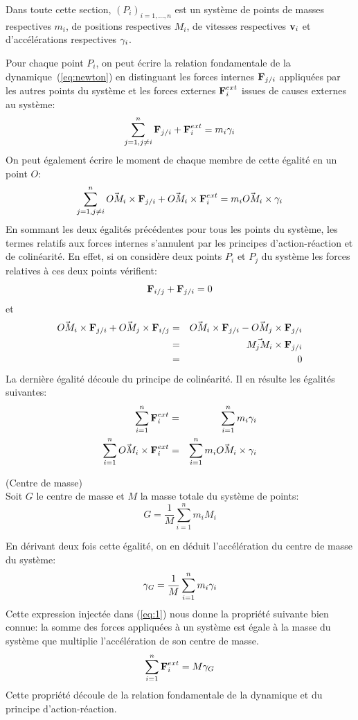 Dans toute cette section, $(P_i)_{i=1,...,n}$ est un système de points
de masses respectives $m_i$, de positions respectives $M_i$, de
vitesses respectives $\textbf{v}_{i}$ et d'accélérations respectives $\gamma_{i}$.

Pour chaque point $P_i$, on peut écrire la relation fondamentale de la
dynamique (\ref{eq:newton}) en distinguant les forces internes
$\textbf{F}_{j/i}$ appliquées par les autres points du système et les
forces externes $\textbf{F}^{ext}_{i}$
issues de causes externes au système:
$$
\sum_{j=1, j\not=i}^n \textbf{F}_{j/i} + \textbf{F}^{ext}_{i} = m_i
\gamma_{i}
$$
On peut également écrire le moment de chaque membre de cette égalité
en un point $O$:
$$
\sum_{j=1, j\not=i}^n \vec{OM_i}\times \textbf{F}_{j/i} +
\vec{OM_i}\times\textbf{F}^{ext}_{i} = m_i \vec{OM_i}\times \gamma_{i}
$$
En sommant les deux égalités précédentes pour tous les points du
système, les termes relatifs aux forces internes s'annulent par les
principes d'action-réaction et de colinéarité. En effet, si on
considère deux points $P_i$ et $P_j$ du système les forces relatives
à ces deux points vérifient:
$$
\textbf{F}_{i/j} + \textbf{F}_{j/i} = 0
$$
et
\begin{eqnarray*}
\vec{OM_i}\times \textbf{F}_{j/i} + \vec{OM_j}\times
\textbf{F}_{i/j}&=&
\vec{OM_i}\times \textbf{F}_{j/i} - \vec{OM_j}\times
\textbf{F}_{j/i} \\
&=&
\vec{M_{j}M_{i}} \times \textbf{F}_{j/i} \\
&=& 0
\end{eqnarray*}
La dernière égalité découle du principe de colinéarité.
Il en résulte les égalités suivantes:
\begin{eqnarray}
\label{eq:1}
\sum_{i=1}^n \textbf{F}^{ext}_{i} &=& \sum_{i=1}^n m_i \gamma_{i} \\
\label{eq:2}
\sum_{i=1}^n \vec{OM_i}\times\textbf{F}^{ext}_{i}
&=& \sum_{i=1}^n m_i \vec{OM_i}\times \gamma_{i}
\end{eqnarray}

\begin{mydef}(Centre de masse)\\
  Soit $G$ le centre de masse et $M$ la
  masse totale du système de
  points:
  $$
  G = \frac{1}{M}\sum_{i=1}^{n} m_i M_i
  $$
\end{mydef}

En dérivant deux fois cette égalité, on en déduit l'accélération du
centre de masse du système:
$$
\gamma_{G} = \frac{1}{M}\sum_{i=1}^{n} m_i \gamma_{i}
$$
Cette expression injectée dans (\ref{eq:1}) nous donne la propriété
suivante bien connue: la somme des forces appliquées à un système est
égale à la masse du système que multiplie l'accélération de son centre
de masse.
$$
\sum_{i=1}^n \textbf{F}^{ext}_{i} = M \gamma_{G} \\
$$
Cette propriété découle de la relation fondamentale de la dynamique et
du principe d'action-réaction.


